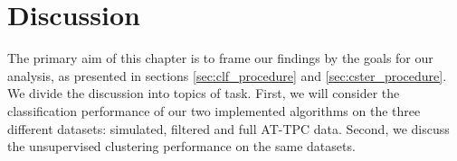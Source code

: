 \chapter{Discussion}
The primary aim of this chapter is to frame our findings by the goals for our analysis, as presented in sections \ref{sec:clf_procedure} and \ref{sec:cster_procedure}. We divide the discussion into topics of task. First, we will consider the classification performance of our two implemented algorithms on the three different datasets: simulated, filtered and full AT-TPC data. Second, we discuss the unsupervised clustering performance on the same datasets. 
